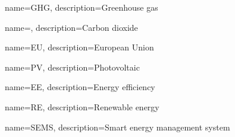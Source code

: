 \makeglossaries

{
    name=GHG,
    description={Greenhouse gas}
}

{
    name=,
    description={Carbon dioxide}
}

{
    name=EU,
    description={European Union}
}

{
    name=PV,
    description={Photovoltaic}
}

{
    name=EE,
    description={Energy efficiency}
}

{
    name=RE,
    description={Renewable energy}
}

{
    name=SEMS,
    description={Smart energy management system}
}